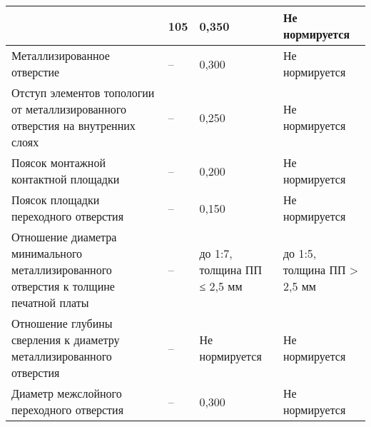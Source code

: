 \begin{longtable}{|p{5cm}|p{2cm}|p{3cm}|p{4cm}|}
                                   & 105                           & 0,350                       & Не нормируется \\ \hline
Металлизированное отверстие & --                     & 0,300                      & Не нормируется \\ \hline
Отступ элементов топологии от металлизированного отверстия на внутренних слоях & --                     & 0,250                      & Не нормируется \\ \hline
 Поясок монтажной контактной площадки & --                     & 0,200                      & Не нормируется \\ \hline
 Поясок площадки переходного отверстия & --                     & 0,150                      & Не нормируется \\ \hline
Отношение диаметра минимального металлизированного отверстия к толщине печатной платы & --                     & до 1:7, толщина ПП ≤ 2,5 мм                      & до 1:5, толщина ПП > 2,5 мм \\ \hline
Отношение глубины сверления к диаметру металлизированного отверстия & --                     & Не нормируется                      & Не нормируется \\ \hline
Диаметр межслойного переходного отверстия & -- & 0,300  & Не нормируется  \\ \hline


\end{longtable}
